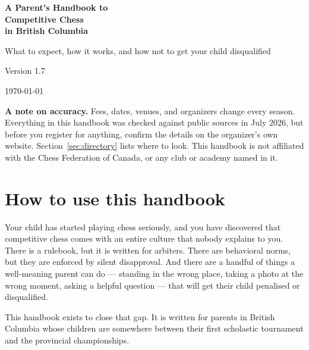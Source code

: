 \documentclass[10pt,letterpaper]{article}
\begin{document}
\begin{titlepage}
\centering
\vspace*{2.5cm}
{\Huge\bfseries\color{boardgreen} A Parent's Handbook to\\[0.3em] Competitive Chess\\[0.3em] in British Columbia\par}
\vspace{1.5cm}
{\Large What to expect, how it works, and how not to get your child disqualified\par}
\vspace{2.5cm}
{\large Version 1.7\par}
{\large \today\par}
\vfill
\begin{minipage}{0.85\textwidth}
\small
\textbf{A note on accuracy.} Fees, dates, venues, and organizers change every
season. Everything in this handbook was checked against public sources in
July 2026, but before you register for anything, confirm the details on the
organizer's own website. Section~\ref{sec:directory} lists where to look.
This handbook is not affiliated with the Chess Federation of Canada, or any club or academy named in it.
\end{minipage}
\vspace{1.5cm}
\end{titlepage}

\tableofcontents
\newpage

\section{How to use this handbook}

Your child has started playing chess seriously, and you have discovered that
competitive chess comes with an entire culture that nobody explains to you.
There is a rulebook, but it is written for arbiters. There are behavioral norms, but they
are enforced by silent disapproval. And there are a handful of things a
well-meaning parent can do --- standing in the wrong place, taking a photo at
the wrong moment, asking a helpful question --- that will get their child
penalised or disqualified.

This handbook exists to close that gap. It is written for parents in British
Columbia whose children are somewhere between their first scholastic
tournament and the provincial championships.
\end{document}
